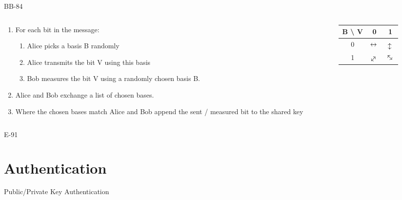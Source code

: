 \documentclass{beamer}
\newcommand{\myarrow}[1][-45]{%
  \mathrel{%
    \text{$
     \begin{tikzpicture}[baseline = -0.5ex]
       \node[inner sep=0pt,outer sep=0pt,rotate = #1] (a) at (0,0)  {$\leftrightarrow{}$};
    \end{tikzpicture}
    $}%
  }%
}%
\begin{document}
	\begin{frame}{BB-84} %
		\begin{columns}
			\begin{column}{0.7\textwidth}
				\begin{enumerate}
					\item For each bit in the message:
						\begin{enumerate}
							\item Alice picks a basis B randomly
							\item Alice transmits the bit V using this basis
							\item Bob measures the bit V using a randomly chosen basis B.
						\end{enumerate}
					\item Alice and Bob exchange a list of chosen bases.
					\item Where the chosen bases match Alice and Bob append the sent / measured bit to the shared key
				\end{enumerate}
			\end{column}
			\vrule{}
			\begin{column}{0.3\textwidth}
				\begin{table}
					\begin{tabular}{c | c  c}
						 B \textbackslash \; V & 0 & 1 \\
						  \hline
						0 & $\myarrow[0]$ & $\myarrow[90]$ \\
						1 & $\myarrow[45]$ & $\myarrow[-45]$ \\
					\end{tabular}
	
				\end{table}

			\end{column}
		\end{columns}
	\end{frame}

	\begin{frame}{E-91} %

	\end{frame}

	\section{Authentication}

	\begin{frame}{Public/Private Key Authentication} %

	\end{frame}
\end{document}
